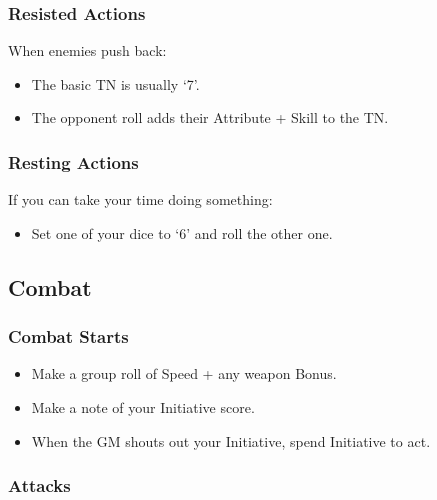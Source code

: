 \begin{multicols}{2}
\begin{itemize}
\end{itemize}

\subsubsection{Resisted Actions}

When enemies push back:

\begin{itemize}

\item{The basic TN is usually `7'.}
\item{The opponent roll adds their Attribute + Skill to the TN.}

\end{itemize}

\subsubsection{Resting Actions}

If you can take your time doing something:

\begin{itemize}

\item{Set one of your dice to `6' and roll the other one.}

\end{itemize}

\subsection{Combat}

\subsubsection{Combat Starts}

\begin{itemize}

	\item{Make a group roll of Speed + any weapon Bonus.}
	\item{Make a note of your Initiative score.}
	\item{When the GM shouts out your Initiative, spend Initiative to act.}

\end{itemize}

\subsubsection{Attacks}


\end{multicols}
